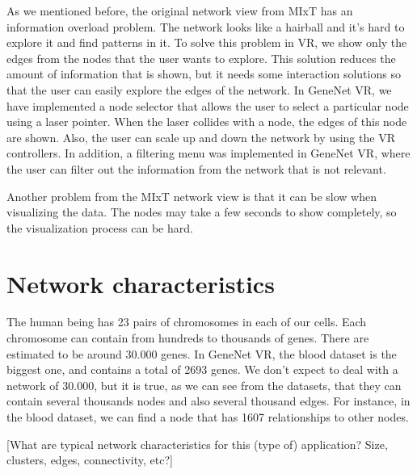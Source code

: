 As we mentioned before, the original network view from MIxT has an information overload problem. The network looks like a hairball and it's hard to explore it and find patterns in it. To solve this problem in VR, we show only the edges from the nodes that the user wants to explore. This solution reduces the amount of information that is shown, but it needs some interaction solutions so that the user can easily explore the edges of the network. In GeneNet VR, we have implemented a node selector that allows the user to select a particular node using a laser pointer. When the laser collides with a node, the edges of this node are shown. Also, the user can scale up and down the network by using the VR controllers. In addition, a filtering menu was implemented in GeneNet VR, where the user can filter out the information from the network that is not relevant.

Another problem from the MIxT network view is that it can be slow when visualizing the data. The nodes may take a few seconds to show completely, so the visualization process can be hard.

\section{Network characteristics}
The human being has 23 pairs of chromosomes in each of our cells. Each chromosome can contain from hundreds to thousands of genes. There are estimated to be around 30.000 genes. In GeneNet VR, the blood dataset is the biggest one, and contains a total of 2693 genes. We don't expect to deal with a network of 30.000, but it is true, as we can see from the datasets, that they can contain several thousands nodes and also several thousand edges. For instance, in the blood dataset, we can find a node that has 1607 relationships to other nodes.

[What are typical network characteristics for this (type of) application? Size, clusters, edges, connectivity, etc?]
